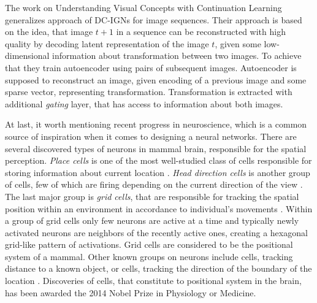 The work on Understanding Visual Concepts with Continuation Learning \cite{Whitney2016} generalizes approach of DC-IGNs for image sequences.
Their approach is based on the idea, that image $t+1$ in a sequence can be reconstructed with high quality by decoding latent representation of the image $t$, given some low-dimensional information about transformation between two images.
To achieve that they train autoencoder using pairs of subsequent images.
Autoencoder is supposed to reconstruct an image, given encoding of a previous image and some sparse vector, representing transformation.
Transformation is extracted with additional \textit{gating} layer, that has access to information about both images.

At last, it worth mentioning recent progress in neuroscience, which is a common source of inspiration when it comes to designing a neural networks.
There are several discovered types of neurons in mammal brain, responsible for the spatial perception.
\textit{Place cells} is one of the most well-studied class of cells responsible for storing information about current location \cite{Fenton2009, Hartley2014}.
\textit{Head direction cells} is another group of cells, few of which are firing depending on the current direction of the view \cite{Taube1990, Taube1990a}.
The last major group is \textit{grid cells}, that are responsible for tracking the spatial position within an environment in accordance to individual's movements \cite{Moser2008}.
Within a group of grid cells only few neurons are active at a time and typically newly activated neurons are neighbors of the recently active ones, creating a hexagonal grid-like pattern of activations.
Grid cells are considered to be the positional system of a mammal.
Other known groups on neurons include cells, tracking distance to a known object, or cells, tracking the direction of the boundary of the location \cite{Lever2009}.
Discoveries of cells, that constitute to positional system in the brain, has been awarded the 2014 Nobel Prize in Physiology or Medicine.
